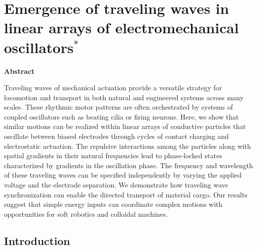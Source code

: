 \chapter{Emergence of traveling waves in linear arrays of electromechanical oscillators$^{*}$}
\begin{center}
\vspace*{1\baselineskip}
\textbf{Abstract}
\end{center}
Traveling waves of mechanical actuation provide a versatile strategy for locomotion and transport in both natural and engineered systems across many scales. These rhythmic motor patterns are often orchestrated by systems of coupled oscillators such as beating cilia or firing neurons. Here, we show that similar motions can be realized within linear arrays of conductive particles that oscillate between biased electrodes through cycles of contact charging and electrostatic actuation. The repulsive interactions among the particles along with spatial gradients in their natural frequencies lead to phase-locked states characterized by gradients in the oscillation phase. The frequency and wavelength of these traveling waves can be specified independently by varying the applied voltage and the electrode separation. We demonstrate how traveling wave synchronization can enable the directed transport of material cargo. Our results suggest that simple energy inputs can coordinate complex motions with opportunities for soft robotics and colloidal machines.

\section{Introduction} 

